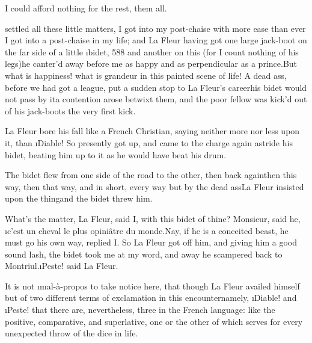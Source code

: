 \documentclass[twoside]{article}
\begin{document}
I could afford nothing for the rest,\break
{}
them all.

\newpage





 settled all these little matters, I got into my post-chaise with
more ease than ever I got into a post-chaise in my life; and La Fleur
having got one large jack-boot on the far side of a little \i{bidet}, {588}
and another on this (for I count nothing of his legs)\tsk he canter’d away
before me as happy and as perpendicular as a prince.\tsk But what is
happiness! what is grandeur in this painted scene of life!  A dead ass,
before we had got a league, put a sudden stop to La Fleur’s career\tsk his
bidet would not pass by it\tsk a contention arose betwixt them, and the poor
fellow was kick’d out of his jack-boots the very first kick.

La Fleur bore his fall like a French Christian, saying neither more nor
less upon it, than \i{Diable}!  So presently got up, and came to the charge
again astride his bidet, beating him up to it as he would have beat his
drum.

The bidet flew from one side of the road to the other, then back
again\tsk then this way, then that way, and in short, every way but by the
dead ass\tsk La Fleur insisted upon the thing\tsk and the bidet threw him.

What’s the matter, La Fleur, said I, with this bidet of thine?  Monsieur,
said he, \i{c’est un cheval le plus opiniâtre du monde}.\tsk Nay, if he is a
conceited beast, he must go his own way, replied I.  So La Fleur got off
him, and giving him a good sound lash, the bidet took me at my word, and
away he scampered back to Montriul.\tsk \i{Peste}! said La Fleur.

It is not \i{mal-à-propos} to take notice here, that though La Fleur
availed himself but of two different terms of exclamation in this
encounter\tsk namely, \i{Diable}! and \i{Peste}! that there are, nevertheless,
three in the French language: like the positive, comparative, and
superlative, one or the other of which serves for every unexpected throw
of the dice in life.
\end{document}
